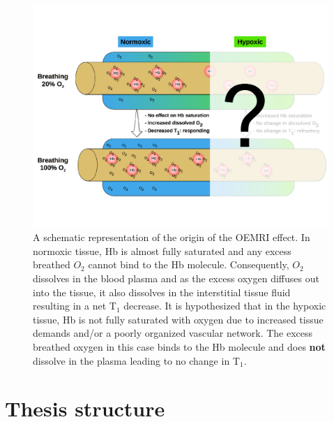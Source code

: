 	\begin{figure}
		\begin{center}
		\includegraphics[width=\textwidth]{./intro/intro-images/oemriDark.pdf}
		\caption{A schematic representation of the origin of the OEMRI effect. In normoxic tissue, Hb is almost fully saturated and any excess breathed ${O_2}$ cannot bind to the Hb molecule. Consequently, ${O_2}$ dissolves in the blood plasma and as the excess oxygen diffuses out into the tissue, it also dissolves in the interstitial tissue fluid resulting in a net T$_1$ decrease. It is hypothesized that in the hypoxic tissue, Hb is not fully saturated with oxygen due to increased tissue demands and/or a poorly organized vascular network. The excess breathed oxygen in this case binds to the Hb molecule and does \textbf{not} dissolve in the plasma leading to no change in T$_1$.}
		\label{oemri}
		\end{center}
	\end{figure}

\section{Thesis structure}

